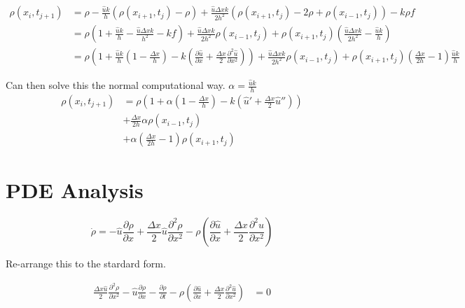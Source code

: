 \documentclass[a4paper]{article}
\begin{document}
\begin{align*}
\rho ( x_i , t_{j+1}) & = \rho - \frac{\hat{u} k }{h} \left( \rho (x_{i+1} , t_j ) - \rho \right) + \frac{\hat{u} \Delta x k }{2 h ^2} \left( \rho ( x_{i + 1 }, t_j ) - 2 \rho + \rho ( x_{i-1} , t_j ) \right) - k \rho f \\
& = \rho \left( 1 + \frac{\hat{u } k }{h} - \frac{\hat{u} \Delta x k }{h^2} - kf \right) + \frac{\hat{u} \Delta x k }{2 h ^2} \rho ( x_{i-1} , t_j )  + \rho ( x_{i+1} , t_j ) \left( \frac{\hat{u} \Delta x k}{ 2 h ^2} - \frac{\hat{u} k}{h} \right) \\
& = \rho \left(1 + \frac{\hat{u} k }{h} \left(1 - \frac{\Delta x}{h} \right) - k \left( \frac{\partial \hat{u}}{\partial x} + \frac{\Delta x }{2} \frac{\partial ^2 \hat{u}}{\partial x^2} \right)  \right) + \frac{\hat{u} \Delta x k }{2 h ^2} \rho ( x_{i-1} , t_j ) + \rho ( x_{i+1} , t_j ) \left( \frac{\Delta x }{2h} - 1 \right) \frac{\hat{u} k }{h}
\end{align*}

Can then solve this the normal computational way.
$ \alpha = \frac{\hat{u} k}{h}$
\begin{align*}
\rho ( x_i, t_{j+1} ) & = \rho \left( 1 + \alpha \left( 1 - \frac{\Delta x}{h} \right) - k \left( \hat{u} ' + \frac{\Delta x}{2} \hat{u} '' \right) \right) \\
& + \frac{\Delta x}{2h} \alpha \rho(x_{i-1}, t_j) \\
& + \alpha \left( \frac{\Delta x}{2h} - 1 \right) \rho (x_{i+1} , t_j )
\end{align*}

\newpage

\section{PDE Analysis}

\begin{equation}
\dot{\rho} = - \hat{u} \frac{\partial \rho}{\partial x} + \frac{\Delta x}{2} \hat{u} \frac{\partial ^2 \rho}{\partial x ^2} - \rho \left( \frac{\partial \hat{u}}{\partial x} + \frac{\Delta x }{2} \frac{\partial ^2 \hat{u}}{\partial x^2} \right) 
\end{equation}

Re-arrange this to the stardard form. 

\begin{align*}
\frac{\Delta x \hat{u}}{2} \frac{\partial ^2 \rho }{\partial x ^2} - \hat{u} \frac{\partial \rho}{\partial x} - \frac{\partial \rho}{\partial t} - \rho \left( \frac{\partial \hat{u}}{\partial x} + \frac{\Delta x }{2} \frac{\partial ^2 \hat{u}}{\partial x^2} \right) & = 0 
\end{align*}
\end{document}

